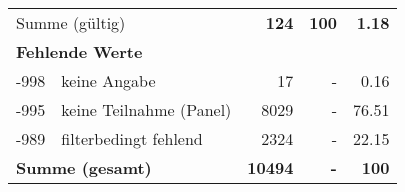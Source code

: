 \begin{longtable}{lXrrr}
     \midrule
     \multicolumn{2}{l}{Summe (gültig)} &
       \textbf{\num{124}} &
     \textbf{\num{100}} &
       \textbf{\num[round-mode=places,round-precision=2]{1.18}} \\
     \multicolumn{5}{l}{\textbf{Fehlende Werte}}\\
       -998 &
       keine Angabe &
         \num{17} &
        - &
         \num[round-mode=places,round-precision=2]{0.16} \\
       -995 &
       keine Teilnahme (Panel) &
         \num{8029} &
        - &
         \num[round-mode=places,round-precision=2]{76.51} \\
       -989 &
       filterbedingt fehlend &
         \num{2324} &
        - &
         \num[round-mode=places,round-precision=2]{22.15} \\
     \midrule
     \multicolumn{2}{l}{\textbf{Summe (gesamt)}} &
          \textbf{\num{10494}} &
        \textbf{-} &
        \textbf{\num{100}} \\
     \bottomrule
     \end{longtable}
     
